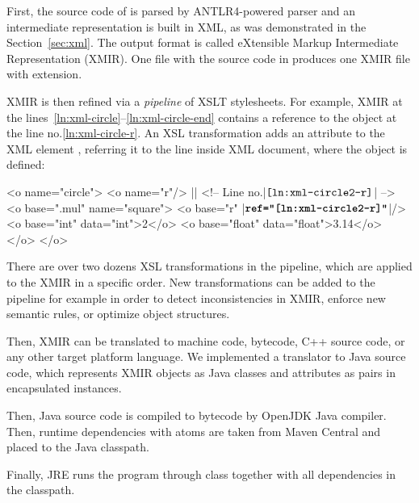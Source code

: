 First, the source code of \eo{} is parsed by ANTLR4-powered
parser and an intermediate representation is built in XML,
as was demonstrated in the Section~\ref{sec:xml}.
The output format is called eXtensible Markup Intermediate Representation (XMIR).
One  file with
the source code in \eo{} produces one XMIR file with  extension.

XMIR is then refined via a \emph{pipeline} of XSLT stylesheets.
For example, XMIR at the
lines~\ref{ln:xml-circle}--\ref{ln:xml-circle-end} contains a
reference to the object  at the line no.\ref{ln:xml-circle-r}.
An XSL transformation adds an attribute  to the XML element ,
referring it to the line inside XML document, where the object  is defined:

\begin{ffcode}
<o name="circle">
  <o name="r"/> |$\label{ln:xml-circle2-r}$| <!-- Line no.|$\texttt{\ref{ln:xml-circle2-r}}$| -->
  <o base=".mul" name="square">
    <o base="r" |$\textbf{\texttt{ref="\ref{ln:xml-circle2-r}"}}$|/>
    <o base="int" data="int">2</o>
    <o base="float" data="float">3.14</o>
  </o>
</o>
\end{ffcode}

There are over two dozens XSL transformations in the pipeline, which
are applied to the XMIR in a specific order. New transformations can
be added to the pipeline for example in order to detect inconsistencies
in XMIR, enforce new semantic rules, or optimize object structures.

Then, XMIR can be translated to machine code, bytecode, C++ source code,
or any other target platform language. We implemented
a translator to Java source code, which represents
XMIR objects as Java classes and attributes as pairs in encapsulated
 instances.

Then, Java source code is compiled to bytecode by OpenJDK Java compiler.
Then, runtime dependencies with atoms are taken from Maven Central
and placed to the Java classpath.

Finally, JRE runs the program through  class together with
all  dependencies in the classpath.

